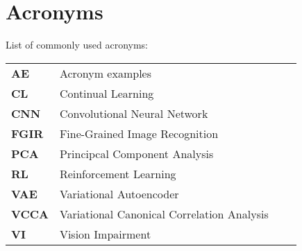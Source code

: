 
\chapter{Acronyms}
\label{chap:acronyms}

List of commonly used acronyms: \\

\begin{tabular}{llll}
	\textbf{AE}			&	Acronym examples \\
	\textbf{CL}			& 	Continual Learning \\
	\textbf{CNN}		& 	Convolutional Neural Network \\
	\textbf{FGIR}		& 	Fine-Grained Image Recognition \\
	\textbf{PCA}		& 	Principcal Component Analysis \\
	\textbf{RL}			& 	Reinforcement Learning \\
	\textbf{VAE}		&	Variational Autoencoder \\
	\textbf{VCCA}		&	Variational Canonical Correlation Analysis \\
	\textbf{VI} 		&	Vision Impairment \\
\end{tabular}